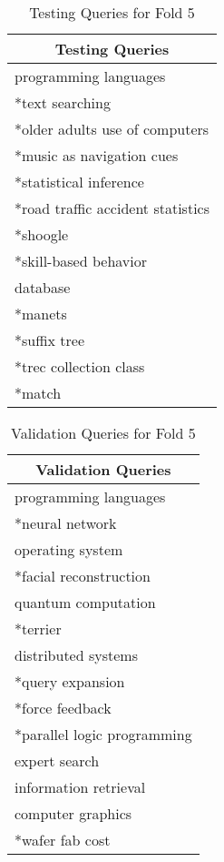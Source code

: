 \begin{table}
\centering
\begin{tabular}{|l|}
\hline \multicolumn{1}{|c|}{\textbf{Testing Queries}} \\
\hline programming languages \\
\hline *text searching \\
\hline *older adults use of computers \\
\hline *music as navigation cues \\ 
\hline *statistical inference \\
\hline *road traffic accident statistics \\ 
\hline *shoogle \\
\hline *skill-based behavior \\ 
\hline database \\
\hline *manets \\ 
\hline *suffix tree \\
\hline *trec collection class \\ 
\hline *match \\
\hline
\end{tabular}
\caption{Testing Queries for Fold 5} \label{table:fold5testing}
\end{table}

\begin{table}
\centering
\begin{tabular}{|l|}
\hline \multicolumn{1}{|c|}{\textbf{Validation Queries}} \\
\hline programming languages \\
\hline *neural network \\
\hline operating system \\
\hline *facial reconstruction \\ 
\hline quantum computation \\
\hline *terrier \\ 
\hline distributed systems \\
\hline *query expansion \\ 
\hline *force feedback \\
\hline *parallel logic programming \\ 
\hline expert search \\
\hline information retrieval \\ 
\hline computer graphics \\
\hline *wafer fab cost \\
\hline
\end{tabular}
\caption{Validation Queries for Fold 5} \label{table:fold5validating}
\end{table}

